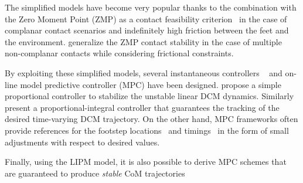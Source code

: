 The simplified models have become very popular thanks to the combination with the Zero Moment Point
(ZMP) as a contact feasibility criterion~\citep{Vukobratovic1969} in the case of complanar contact
scenarios and indefinitely high friction between the feet and the environment.
\cite{Caron2017ZMPConstraints} generalize the ZMP contact stability in the case of multiple non-complanar
contacts while considering frictional constraints.







By exploiting these simplified models, several instantaneous controllers
~\citep{Hopkins2015,Englsberger2015,Englsberger2018,Englsberger2019} and on-line model predictive
controller (MPC)
\citep{wieber2006trajectory,diedam2008online, Naveau2017AControl,
  Griffin2016, bombile2017capture,8594277} have been designed. \cite{Englsberger2015}
propose a simple proportional controller to stabilize the unstable linear DCM dynamics.
Similarly~\cite{Hopkins2015} present a proportional-integral controller that guarantees the tracking
of the desired time-varying DCM trajectory. On the other hand, MPC frameworks often provide
references for the footstep locations~\citep{diedam2008online,Feng2016RobustOptimization,Joe2018BalanceRobot,Shafiee-Ashtiani2017a} and timings~\citep{Khadiv2016StepGaits,Griffin2017WalkingAtlas} in the form of small adjustments with respect to desired values. 
\par
Finally, using the LIPM model, it is also possible to derive MPC schemes that are guaranteed to produce \emph{stable} CoM trajectories~\citep{Scianca2016IntrinsicallyGeneration,Scianca2020MPCFeasibility}



